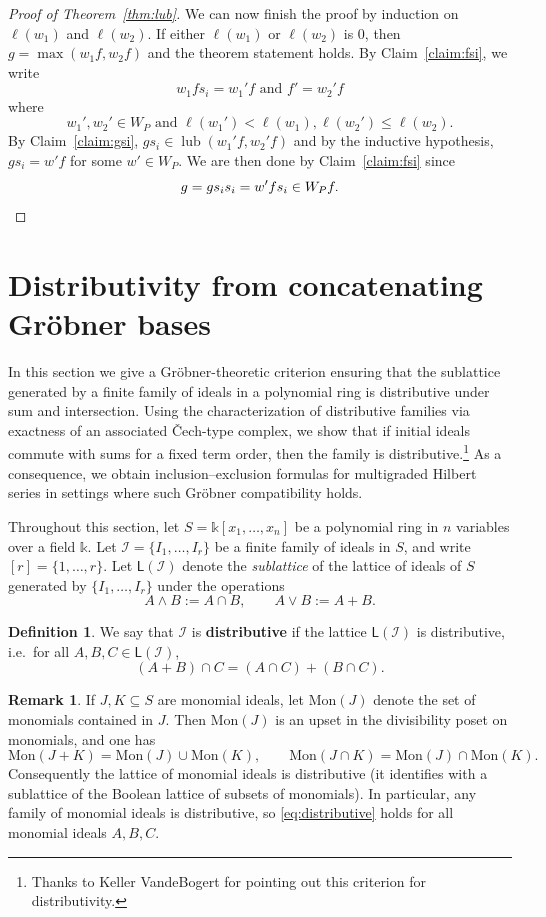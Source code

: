 \documentclass[12pt,reqno]{amsart}
\theoremstyle{definition}
\newtheorem{definition}[lemma]{Definition}
\newtheorem{remark}[lemma]{Remark}
\renewcommand{\k}{\mathbb{k}}
\newcommand{\cI}{\mathcal{I}}
\newcommand{\Mon}{\text{Mon}}
\newcommand{\lub}{\operatorname{lub}}
\begin{document}
{\begin{proof}[Proof of Theorem~\ref{thm:lub}]
    
    
    We can now finish the proof by induction on $\ell(w_1)$ and $\ell(w_2)$. If either $\ell(w_1)$ or $\ell(w_2)$ is $0$, then $g = \max(w_1f,w_2f)$ and the theorem statement holds. By Claim~\ref{claim:fsi}, we write $$w_1fs_i = w_1'f\text{ and }f' = w_2'f$$
    where 
    $$w_1',w_2'\in W_P\text{ and }\ell(w_1')<\ell(w_1),\ell(w_2')\leq \ell(w_2).$$ 
    By Claim~\ref{claim:gsi}, $gs_i\in \lub(w_1'f,w_2'f)$ and by the inductive hypothesis, 
    $gs_i = w'f$ for some $w'\in W_P$. We are then done by Claim~\ref{claim:fsi} since
    \[
g = gs_is_i = w'fs_i \in W_Pf.\qedhere
    \]
\end{proof}

\section{Distributivity from concatenating Gr\"obner bases}\label{appendix: distributivity}
In this section we give a Gr\"obner-theoretic criterion ensuring that the sublattice generated by a finite family of ideals in a polynomial ring is distributive under sum and intersection. Using the characterization of distributive families via exactness of an associated \v{C}ech-type complex, we show that if initial ideals commute with sums for a fixed term order, then the family is distributive.\footnote{Thanks to Keller VandeBogert for pointing out this criterion for distributivity.} As a consequence, we obtain inclusion--exclusion formulas for multigraded Hilbert series in settings where such Gr\"obner compatibility holds.

Throughout this section, let $S=\k[x_1,\dots,x_n]$ be a polynomial ring in $n$ variables over a field $\k$.
Let $\cI=\{I_1,\dots,I_r\}$ be a finite family of ideals in $S$, and write $[r]=\{1,\dots,r\}$.
Let $\mathsf{L}(\cI)$ denote the \emph{sublattice} of the lattice of ideals of $S$ generated by $\{I_1,\dots,I_r\}$ under the operations
\[
A\wedge B:=A\cap B,\qquad A\vee B:=A+B.
\]

\begin{definition}\label{def:distributive-family}
We say that $\cI$ is \textbf{distributive} if the lattice $\mathsf{L}(\cI)$ is distributive, i.e.\ for all $A,B,C\in\mathsf{L}(\cI)$,
\begin{equation}\label{eq:distributive}
(A+B)\cap C = (A\cap C) + (B\cap C).
\end{equation}
\end{definition}

\begin{remark}\label{rem:monomial-distributive}
If $J,K\subseteq S$ are monomial ideals, let $\Mon(J)$ denote the set of monomials contained in $J$.
Then $\Mon(J)$ is an upset in the divisibility poset on monomials, and one has
\[
\Mon(J+K)=\Mon(J)\cup \Mon(K),\qquad \Mon(J\cap K)=\Mon(J)\cap \Mon(K).
\]
Consequently the lattice of monomial ideals is distributive (it identifies with a sublattice of the
Boolean lattice of subsets of monomials). In particular, any family of monomial ideals is distributive,
so \eqref{eq:distributive} holds for all monomial ideals $A,B,C$.
\end{remark}


}
\end{document}
